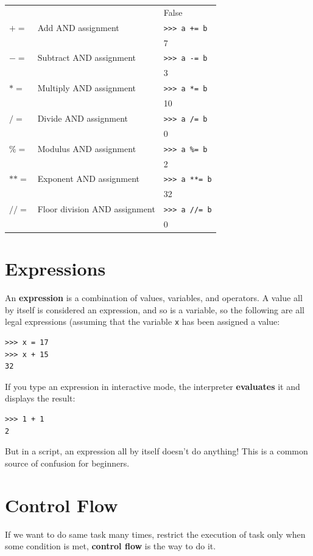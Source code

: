 \documentclass[10pt]{book}
\begin{document}
{\begin{tabular}{lll}
  &      & False \\
$+=$ & Add AND assignment & \verb">>> a += b" \\
  &      & 7 \\
$-=$ & Subtract AND assignment & \verb">>> a -= b" \\
  &      & 3 \\
 $*=$ & Multiply AND assignment & \verb">>> a *= b" \\
  &      & 10 \\
 $/=$ & Divide AND assignment & \verb">>> a /= b" \\
  &      & 0 \\
 $\%=$ & Modulus AND assignment & \verb">>> a %= b" \\
  &      & 2 \\
 $**=$ & Exponent AND assignment & \verb">>> a **= b" \\
  &      & 32 \\
 $//=$ & Floor division AND assignment & \verb">>> a //= b" \\
  &      & 0 \\
  \bottomrule
\end{tabular}


\section{Expressions}
An {\bf expression} is a combination of values, variables, and operators. A value all by itself is considered an expression, and so is a variable, so the following are all legal expressions (assuming that the variable \verb"x" has been assigned a value:

\beforeverb
\begin{verbatim}
>>> x = 17
>>> x + 15
32
\end{verbatim}
\afterverb

If you type an expression in interactive mode, the interpreter {\bf evaluates} it and displays the result:

\beforeverb
\begin{verbatim}
>>> 1 + 1
2
\end{verbatim}
\afterverb
%
But in a script, an expression all by itself doesn't do anything!  This is a common source of confusion for beginners.


\section{Control Flow}
If we want to do same task many times, restrict the execution of task only when some condition is met, {\bf control flow} is the way to do it. 

}
\end{document}
